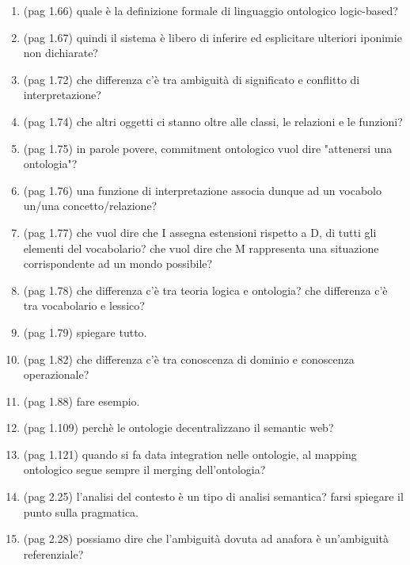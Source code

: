 \begin{enumerate}
	\item (pag 1.66) quale è la definizione formale di linguaggio ontologico logic-based?
	
	\item (pag 1.67) quindi il sistema è libero di inferire ed esplicitare ulteriori iponimie non dichiarate?
	
	\item (pag 1.72) che differenza c'è tra ambiguità di significato e conflitto di interpretazione?
	
	\item (pag 1.74) che altri oggetti ci stanno oltre alle classi, le relazioni e le funzioni?
	
	\item (pag 1.75) in parole povere, commitment ontologico vuol dire "attenersi una ontologia"?
	
	\item (pag 1.76) una funzione di interpretazione associa dunque ad un vocabolo un/una concetto/relazione?
	
	\item (pag 1.77) che vuol dire che I assegna estensioni rispetto a D, di tutti gli elementi del vocabolario? che vuol dire che M rappresenta una situazione corrispondente ad un mondo possibile?
	
	\item (pag 1.78) che differenza c'è tra teoria logica e ontologia? che differenza c'è tra vocabolario e lessico?
	
	\item (pag 1.79) spiegare tutto.
	
	\item (pag 1.82) che differenza c'è tra conoscenza di dominio e conoscenza operazionale?
	
	\item (pag 1.88) fare esempio.
	
	\item (pag 1.109) perchè le ontologie decentralizzano il semantic web?
	
	\item (pag 1.121) quando si fa data integration nelle ontologie, al mapping ontologico segue sempre il merging dell'ontologia?

	\item (pag 2.25) l'analisi del contesto è un tipo di analisi semantica? farsi spiegare il punto sulla pragmatica.
	
	\item (pag 2.28) possiamo dire che l'ambiguità dovuta ad anafora è un'ambiguità referenziale?
	

\end{enumerate}
